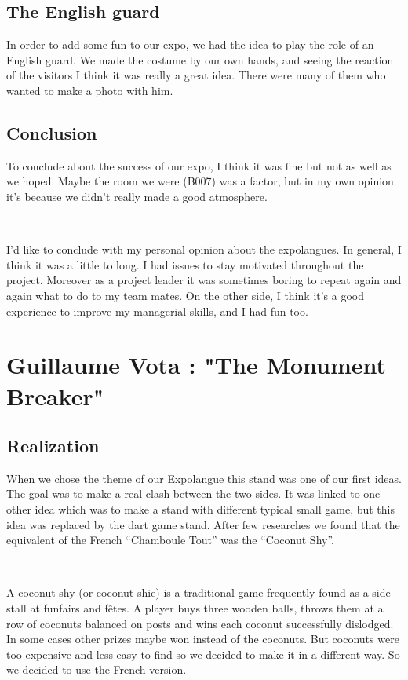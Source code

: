 \documentclass[11pt;a4paper]{report}
\begin{document}
    \subsection{The English guard}
In order to add some fun to our expo, we had the idea to play the role of an English guard. We made the costume by our own hands, and seeing the reaction of the visitors I think it was really a great idea. There were many of them who wanted to make a photo with him.

    \subsection{Conclusion}
    To conclude about the success of our expo, I think it was fine but not as well as we hoped. Maybe the room we were (B007) was a factor, but in my own opinion it's because we didn't really made a good atmosphere.

~

    I'd like to conclude with my personal opinion about the expolangues. In general, I think it was a little to long. I had issues to stay motivated throughout the project. Moreover as a project leader it was sometimes boring to repeat again and again what to do to my team mates. On the other side, I think it's a good experience to improve my managerial skills, and I had fun too.

\newpage
  \section{Guillaume Vota : "The Monument Breaker"}
   \subsection{Realization}
    When we chose the theme of our Expolangue this stand was one of our first ideas. The goal was to make a real clash between the two sides. It was linked to one other idea which was to make a stand with different typical small game, but this idea was replaced by the dart game stand. After few researches we found that the equivalent of the French “Chamboule Tout” was the “Coconut Shy”.

~

    A coconut shy (or coconut shie) is a traditional game frequently found as a side stall at funfairs and fêtes. A player buys three wooden balls, throws them at a row of coconuts balanced on posts and wins each coconut successfully dislodged. In some cases other prizes maybe won instead of the coconuts. But coconuts were too expensive and less easy to find so we decided to make it in a different way. So we decided to use the French version.
\end{document}

